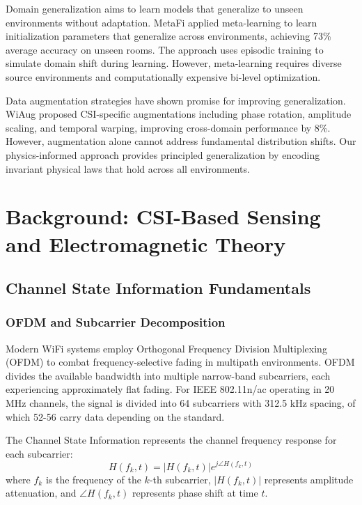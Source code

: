 \documentclass[10pt,journal,compsoc]{IEEEtran}
\begin{document}
Domain generalization aims to learn models that generalize to unseen environments without adaptation. MetaFi \cite{metafi2021} applied meta-learning to learn initialization parameters that generalize across environments, achieving 73\% average accuracy on unseen rooms. The approach uses episodic training to simulate domain shift during learning. However, meta-learning requires diverse source environments and computationally expensive bi-level optimization.

Data augmentation strategies have shown promise for improving generalization. WiAug \cite{wiaug2022} proposed CSI-specific augmentations including phase rotation, amplitude scaling, and temporal warping, improving cross-domain performance by 8\%. However, augmentation alone cannot address fundamental distribution shifts. Our physics-informed approach provides principled generalization by encoding invariant physical laws that hold across all environments.

\section{Background: CSI-Based Sensing and Electromagnetic Theory}
\label{sec:background}

\subsection{Channel State Information Fundamentals}

\subsubsection{OFDM and Subcarrier Decomposition}

Modern WiFi systems employ Orthogonal Frequency Division Multiplexing (OFDM) to combat frequency-selective fading in multipath environments. OFDM divides the available bandwidth into multiple narrow-band subcarriers, each experiencing approximately flat fading. For IEEE 802.11n/ac operating in 20 MHz channels, the signal is divided into 64 subcarriers with 312.5 kHz spacing, of which 52-56 carry data depending on the standard.

The Channel State Information represents the channel frequency response for each subcarrier:
\begin{equation}
H(f_k, t) = |H(f_k, t)| e^{j\angle H(f_k, t)}
\end{equation}
where $f_k$ is the frequency of the $k$-th subcarrier, $|H(f_k, t)|$ represents amplitude attenuation, and $\angle H(f_k, t)$ represents phase shift at time $t$.
\end{document}
